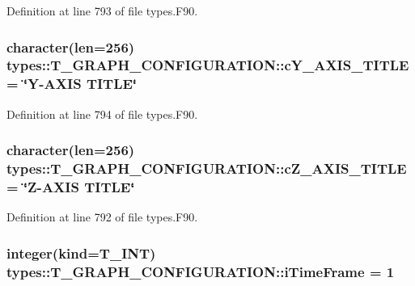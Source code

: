 Definition at line 793 of file types.F90.

\hypertarget{typetypes_1_1_t___g_r_a_p_h___c_o_n_f_i_g_u_r_a_t_i_o_n_ac96bae92e65267c298bd648ab3ca483b}{
\subsubsection[{cY\_\-AXIS\_\-TITLE}]{\setlength{\rightskip}{0pt plus 5cm}character(len=256) {\bf types::T\_\-GRAPH\_\-CONFIGURATION::cY\_\-AXIS\_\-TITLE} = \char`\"{}Y-\/AXIS TITLE\char`\"{}}}
\label{typetypes_1_1_t___g_r_a_p_h___c_o_n_f_i_g_u_r_a_t_i_o_n_ac96bae92e65267c298bd648ab3ca483b}


Definition at line 794 of file types.F90.

\hypertarget{typetypes_1_1_t___g_r_a_p_h___c_o_n_f_i_g_u_r_a_t_i_o_n_a23e889cb931ae72169bb906e6e3ea057}{
\subsubsection[{cZ\_\-AXIS\_\-TITLE}]{\setlength{\rightskip}{0pt plus 5cm}character(len=256) {\bf types::T\_\-GRAPH\_\-CONFIGURATION::cZ\_\-AXIS\_\-TITLE} = \char`\"{}Z-\/AXIS TITLE\char`\"{}}}
\label{typetypes_1_1_t___g_r_a_p_h___c_o_n_f_i_g_u_r_a_t_i_o_n_a23e889cb931ae72169bb906e6e3ea057}


Definition at line 792 of file types.F90.

\hypertarget{typetypes_1_1_t___g_r_a_p_h___c_o_n_f_i_g_u_r_a_t_i_o_n_a123665495a3d529e1f524549593c9e8a}{
\subsubsection[{iTimeFrame}]{\setlength{\rightskip}{0pt plus 5cm}integer(kind={\bf T\_\-INT}) {\bf types::T\_\-GRAPH\_\-CONFIGURATION::iTimeFrame} = 1}}
\label{typetypes_1_1_t___g_r_a_p_h___c_o_n_f_i_g_u_r_a_t_i_o_n_a123665495a3d529e1f524549593c9e8a}


